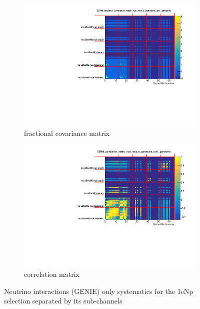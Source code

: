 \documentclass[a4paper]{article}
\begin{document}
\begin{figure}[ht] 
\begin{center}
    \begin{subfigure}[b]{0.45\textwidth}
    \centering
    \includegraphics[width=1.00\textwidth]{CovarianceMatrices/SBNfit_fractional_covariance_matrix_nue_reco_e_genietune_run1_genieonly.pdf}
    \caption{fractional covariance matrix}
    \end{subfigure}
    \begin{subfigure}[b]{0.45\textwidth}
    \centering
    \includegraphics[width=1.00\textwidth]{CovarianceMatrices/SBNfit_correlation_matrix_nue_reco_e_genietune_run1_genieonly.pdf}
    \caption{correlation matrix}
    \end{subfigure}
\caption{\label{fig:fluxmatrices} Neutrino interactions (GENIE) only systematics for the 1eNp selection separated by its sub-channels}
\end{center}
\end{figure}
\end{document}
